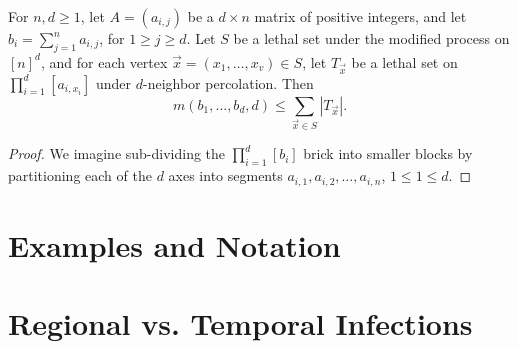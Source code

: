 \begin{lem}
\label{lem:recursion}
For $n,d \geq 1$, let $A = (a_{i,j})$ be a $d \times n$ matrix of positive integers, and let $b_i = \sum_{j=1}^n a_{i,j}$, for $1 \geq j \geq d$. Let $S$ be a lethal set under the modified process on $[n]^d$, and for each vertex $\vec{x} = (x_1, \dots, x_v) \in S$, let $T_{\vec{x}}$ be a lethal set on $\prod_{i=1}^d [a_{i,x_i}]$ under $d$-neighbor percolation. Then
$$m(b_1, \dots, b_d, d) \leq \sum_{\vec{x} \in S} |T_{\vec{x}}|.$$
\end{lem}

\begin{proof}
We imagine sub-dividing the $\prod_{i=1}^d [b_{i}]$ brick into smaller blocks by partitioning each of the $d$ axes into segments $a_{i,1}, a_{i,2}, \dots, a_{i,n}$, $1 \leq 1 \leq d$. 
\end{proof}


\section{Examples and Notation}


\section{Regional vs. Temporal Infections}

